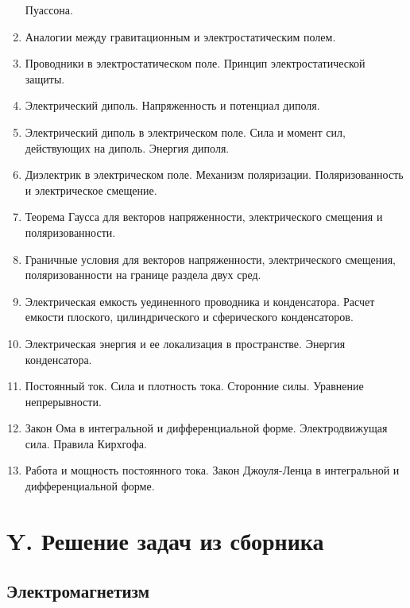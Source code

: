 \documentclass[12pt]{article}
\begin{document}
\begin{enumerate}
        Пуассона.  
        \item Аналогии между гравитационным и электростатическим полем.  
        \item Проводники в электростатическом поле. Принцип электростатической защиты.  
        \item Электрический диполь. Напряженность и потенциал диполя. 
        \item Электрический диполь в электрическом поле. Сила и момент сил, действующих на 
        диполь. Энергия диполя. 
        \item Диэлектрик в электрическом поле. Механизм поляризации. Поляризованность и 
        электрическое смещение. 
        \item Теорема Гаусса для векторов напряженности, электрического смещения и 
        поляризованности.  
        \item Граничные условия для векторов напряженности, электрического смещения, 
        поляризованности на границе раздела двух сред.   
        \item Электрическая емкость уединенного проводника и конденсатора. Расчет емкости 
        плоского, цилиндрического и сферического конденсаторов. 
        \item Электрическая энергия и ее локализация в пространстве. Энергия конденсатора.   
        \item Постоянный ток. Сила и плотность тока. Сторонние силы. Уравнение непрерывности. 
        \item Закон Ома в интегральной и дифференциальной форме. Электродвижущая сила. Правила 
        Кирхгофа. 
        \item Работа и мощность постоянного тока. Закон Джоуля-Ленца в интегральной и 
        дифференциальной форме.
    \end{enumerate}






\clearpage

\section{Y. Решение задач из сборника}

\subsection{Электромагнетизм}
\end{document}
